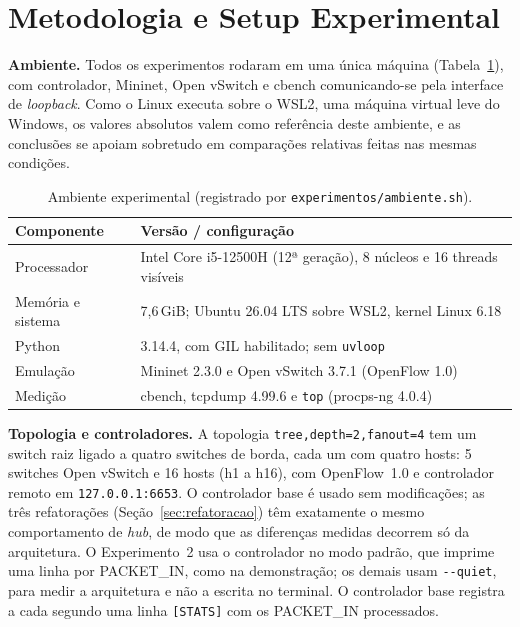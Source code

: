 \documentclass[12pt]{article}
\begin{document}
\section{Metodologia e Setup Experimental}
\label{sec:metodologia}

\textbf{Ambiente.} Todos os experimentos rodaram em uma única máquina
(Tabela~\ref{tab:ambiente}), com controlador, Mininet, Open vSwitch e cbench
comunicando-se pela interface de \textit{loopback}. Como o Linux executa sobre o WSL2,
uma máquina virtual leve do Windows, os valores absolutos valem como referência deste
ambiente, e as conclusões se apoiam sobretudo em comparações relativas feitas nas
mesmas condições.

\begin{table}[!htb]
\centering
\caption{Ambiente experimental (registrado por \texttt{experimentos/ambiente.sh}).}
\label{tab:ambiente}
\small
\begin{tabular}{@{}ll@{}}
\toprule
Componente & Versão / configuração \\
\midrule
Processador & Intel Core i5-12500H (12ª geração), 8 núcleos e 16 threads visíveis \\
Memória e sistema & 7,6\,GiB; Ubuntu 26.04 LTS sobre WSL2, kernel Linux 6.18 \\
Python & 3.14.4, com GIL habilitado; sem \texttt{uvloop} \\
Emulação & Mininet 2.3.0 e Open vSwitch 3.7.1 (OpenFlow 1.0) \\
Medição & cbench, tcpdump 4.99.6 e \texttt{top} (procps-ng 4.0.4) \\
\bottomrule
\end{tabular}
\end{table}

\textbf{Topologia e controladores.} A topologia \texttt{tree,depth=2,fanout=4} tem um
switch raiz ligado a quatro switches de borda, cada um com quatro hosts: 5 switches
Open vSwitch e 16 hosts (h1 a h16), com OpenFlow~1.0 e controlador remoto em
\texttt{127.0.0.1:6653}. O controlador base é usado sem modificações; as três
refatorações (Seção~\ref{sec:refatoracao}) têm exatamente o mesmo comportamento de
\textit{hub}, de modo que as diferenças medidas decorrem só da arquitetura. O
Experimento~2 usa o controlador no modo padrão, que imprime uma linha por PACKET\_IN, como
na demonstração; os demais usam \texttt{-{}-quiet}, para medir a arquitetura e não a
escrita no terminal. O controlador base registra a cada segundo uma linha
\texttt{[STATS]} com os PACKET\_IN processados.
\end{document}
